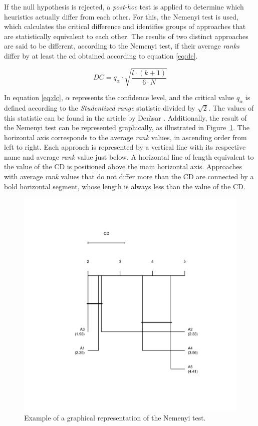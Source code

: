 If the null hypothesis is rejected, a \textit{post-hoc} test is applied to determine which heuristics actually differ from each other. For this, the Nemenyi test is used, which calculates the critical difference and identifies groups of approaches that are statistically equivalent to each other. The results of two distinct approaches are said to be different, according to the Nemenyi test, if their average \textit{ranks} differ by at least the \gls{cd} obtained according to equation \eqref{eq:dc}.

\begin{equation}
    DC = q_{\alpha} \cdot \sqrt{\frac{l \cdot (k + 1)}{6 \cdot N}} \label{eq:dc}
\end{equation}

In equation \eqref{eq:dc}, $\alpha$ represents the confidence level, and the critical value $q_{\alpha}$ is defined according to the \textit{Studentized range} statistic divided by $\sqrt{2}$. The values of this statistic can be found in the article by De\v{m}sar \cite{demsar:2006}. Additionally, the result of the Nemenyi test can be represented graphically, as illustrated in Figure~\ref{fig:ex-nemenyi}. The horizontal axis corresponds to the average \textit{rank} values, in ascending order from left to right. Each approach is represented by a vertical line with its respective name and average \textit{rank} value just below. A horizontal line of length equivalent to the value of the CD is positioned above the main horizontal axis. Approaches with average \textit{rank} values that do not differ more than the CD are connected by a bold horizontal segment, whose length is always less than the value of the CD.

\begin{figure}[!ht] \centering
\includegraphics[scale=0.4]{images/nemenyi-example.pdf}
    \caption{Example of a graphical representation of the Nemenyi test.}
    \label{fig:ex-nemenyi}
\end{figure}

